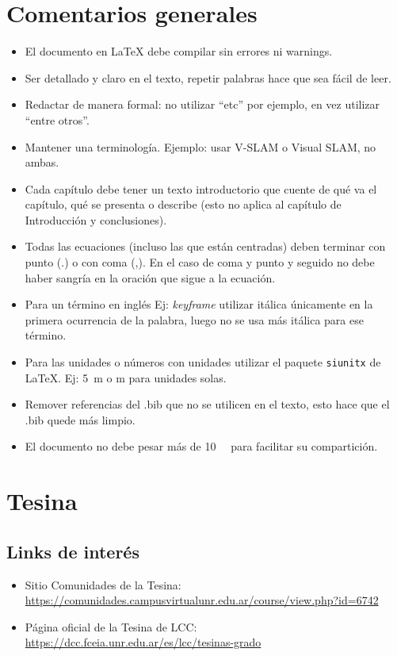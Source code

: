 \documentclass[a4paper,	11pt]{article}
\begin{document}
\section{Comentarios generales}
%
\begin{itemize}
    \item El documento en {\LaTeX} debe compilar sin errores ni warnings.

    \item Ser detallado y claro en el texto, repetir palabras hace que sea fácil de leer.

    \item Redactar de manera formal: no utilizar ``etc'' por ejemplo, en vez utilizar ``entre otros''.

    \item Mantener una terminología. Ejemplo: usar V-SLAM o Visual SLAM, no ambas.

    \item Cada capítulo debe tener un texto introductorio que cuente de qué va el capítulo, qué se presenta o describe (esto no aplica al capítulo de Introducción y conclusiones).
    
    \item Todas las ecuaciones (incluso las que están centradas) deben terminar con punto (.) o con coma (,). En el caso de coma y punto y seguido no debe haber sangría en la oración que sigue a la ecuación.

    \item Para un término en inglés Ej: \emph{keyframe} utilizar itálica únicamente en la primera ocurrencia de la palabra, luego no se usa más itálica para ese término.

    \item Para las unidades o números con unidades utilizar el paquete \lstinline{siunitx} de {\LaTeX}. Ej: \SI{5}{\meter} o \si{\meter} para unidades solas.

    \item Remover referencias del .bib que no se utilicen en el texto, esto hace que el .bib quede más limpio.
    
    \item El documento no debe pesar más de \SI{10}{\mega\byte} para facilitar su compartición.
\end{itemize}

\section{Tesina}
\subsection{Links de interés}
\begin{itemize}
    \item Sitio Comunidades de la Tesina: \url{https://comunidades.campusvirtualunr.edu.ar/course/view.php?id=6742}
    \item Página oficial de la Tesina de LCC: \url{https://dcc.fceia.unr.edu.ar/es/lcc/tesinas-grado}
\end{itemize}
\end{document}
